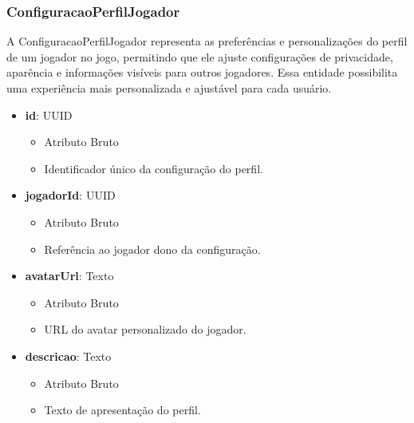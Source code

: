     \subsubsection{ConfiguracaoPerfilJogador}
    A ConfiguracaoPerfilJogador representa as preferências e personalizações do perfil de um jogador no jogo, permitindo que ele ajuste configurações de privacidade, aparência e informações visíveis para outros jogadores. Essa entidade possibilita uma experiência mais personalizada e ajustável para cada usuário.
    \begin{itemize}
        \item \textbf{id}: UUID  
              \begin{itemize}
                  \item Atributo Bruto
                  \item Identificador único da configuração do perfil.
              \end{itemize}
    
        \item \textbf{jogadorId}: UUID  
              \begin{itemize}
                  \item Atributo Bruto
                  \item Referência ao jogador dono da configuração.
              \end{itemize}
    
        \item \textbf{avatarUrl}: Texto  
              \begin{itemize}
                  \item Atributo Bruto
                  \item URL do avatar personalizado do jogador.
              \end{itemize}
    
        \item \textbf{descricao}: Texto  
              \begin{itemize}
                  \item Atributo Bruto
                  \item Texto de apresentação do perfil.
              \end{itemize}
    

\end{itemize}

